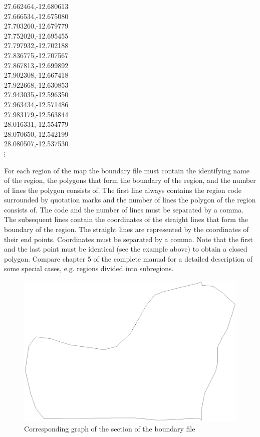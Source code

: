 \documentclass[a4paper]{article}
\begin{document}
 27.662464,-12.680613\\
 27.666534,-12.675080\\
 27.703260,-12.679779\\
 27.752020,-12.695455\\
 27.797932,-12.702188\\
 27.836775,-12.707567\\
 27.867813,-12.699892\\
 27.902308,-12.667418\\
 27.922668,-12.630853\\
 27.943035,-12.596350\\
 27.963434,-12.571486\\
 27.983179,-12.563844\\
 28.016331,-12.554779\\
 28.070650,-12.542199\\
 28.080507,-12.537530\\

\hspace{1cm} $\vdots$

\normalsize

\vspace{0.3cm}

For each region of the map the boundary file must contain the
identifying name of the region, the polygons that form the
boundary of the region, and the number of lines the polygon
consists of. The first line always contains the region code
surrounded by quotation marks and the number of lines the polygon
of the region consists of. The code and the number of lines must
be separated by a comma. The subsequent lines contain the
coordinates of the straight lines that form the boundary of the
region. The straight lines are represented by the coordinates of
their end points. Coordinates must be separated by a comma. Note
that the first and the last point must be identical (see the
example above) to obtain a closed polygon. Compare chapter 5 of
the complete manual for a detailed description of some special
cases, e.g. regions divided into subregions.

\begin{figure}[h]
\centering
\includegraphics [scale=0.3]{grafiken/zambia52.ps}
\caption{\label{zambia52} Corresponding graph of the section of
the boundary file}
\end{figure}
\end{document}
